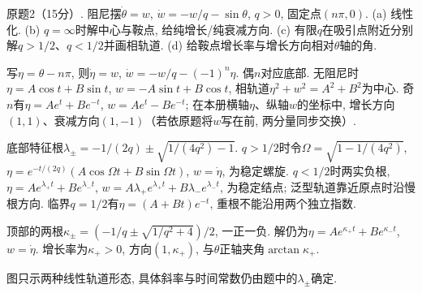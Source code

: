 \begin{exercise}
原题2（15分）. 阻尼摆$\dot\theta=w$, $\dot w=-w/q-\sin\theta$, $q>0$, 固定点$(n\pi,0)$. (a) 线性化. (b) $q=\infty$时解中心与鞍点, 给纯增长/纯衰减方向. (c) 有限$q$在吸引点附近分别解$q>1/2$、$q<1/2$并画相轨道. (d) 给鞍点增长率与增长方向相对$\theta$轴的角.
\end{exercise}
\begin{solution}
写$\eta=\theta-n\pi$, 则$\dot\eta=w$, $\dot w=-w/q-(-1)^n\eta$. 偶$n$对应底部. 无阻尼时$\eta=A\cos t+B\sin t$, $w=-A\sin t+B\cos t$, 相轨道$\eta^2+w^2=A^2+B^2$为中心. 奇$n$有$\eta=Ae^t+Be^{-t}$, $w=Ae^t-Be^{-t}$; 在本册横轴$\eta$、纵轴$w$的坐标中, 增长方向$(1,1)$、衰减方向$(1,-1)$（若依原题将$w$写在前, 两分量同步交换）.

底部特征根$\lambda_\pm=-1/(2q)\pm\sqrt{1/(4q^2)-1}$. $q>1/2$时令$\Omega=\sqrt{1-1/(4q^2)}$, $\eta=e^{-t/(2q)}(A\cos\Omega t+B\sin\Omega t)$, $w=\dot\eta$, 为稳定螺旋. $q<1/2$时两实负根, $\eta=Ae^{\lambda_+t}+Be^{\lambda_-t}$, $w=A\lambda_+e^{\lambda_+t}+B\lambda_-e^{\lambda_-t}$, 为稳定结点; 泛型轨道靠近原点时沿慢根方向. 临界$q=1/2$有$\eta=(A+Bt)e^{-t}$, 重根不能沿用两个独立指数.

顶部的两根$\kappa_\pm=(-1/q\pm\sqrt{1/q^2+4})/2$, 一正一负. 解仍为$\eta=Ae^{\kappa_+t}+Be^{\kappa_-t}$, $w=\dot\eta$. 增长率为$\kappa_+>0$, 方向$(1,\kappa_+)$, 与$\theta$正轴夹角$\arctan\kappa_+$.
\end{solution}
\begin{center}
\end{center}
图只示两种线性轨道形态, 具体斜率与时间常数仍由题中的$\lambda_\pm$确定.

